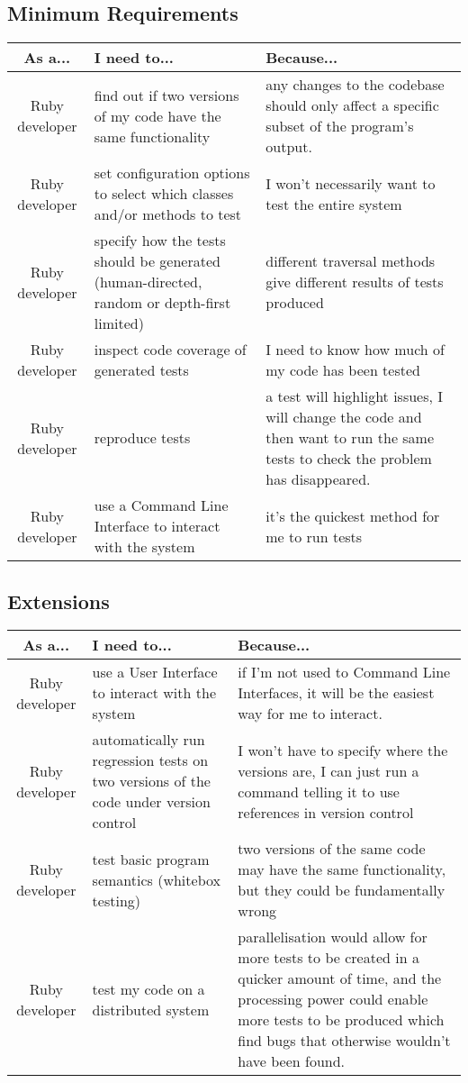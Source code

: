   \subsection{Minimum Requirements}
    \begin{tabular}{| c | p{5cm} | p{5cm} |}
    \hline
    \textbf{As a...} & \textbf{I need to...} & \textbf{Because...} \\
    \hline
    Ruby developer & find out if two versions of my code have the same functionality & any changes to the codebase should only affect a specific subset of the program’s output. \\
    \hline
    Ruby developer & set configuration options to select which classes and/or methods to test & I won't necessarily want to test the entire system \\
    \hline
    Ruby developer & specify how the tests should be generated (human-directed, random or depth-first limited) & different traversal methods give different results of tests produced \\
    Ruby developer & inspect code coverage of generated tests & I need to know how much of my code has been tested \\
    \hline
    Ruby developer & reproduce tests & a test will highlight issues, I will change the code and then want to run the same tests to check the problem has disappeared. \\
    \hline
    Ruby developer & use a Command Line Interface to interact with the system & it's the quickest method for me to run tests \\
    \hline
    \end{tabular}
  \subsection{Extensions}
    \begin{tabular}{| c | p{5cm} | p{5cm} |}
    \hline
    \textbf{As a...} & \textbf{I need to...} & \textbf{Because...} \\
    \hline
    Ruby developer & use a User Interface to interact with the system & if I'm not used to Command Line Interfaces, it will be the easiest way for me to interact. \\
    \hline
    Ruby developer & automatically run regression tests on two versions of the code under version control & I won't have to specify where the versions are, I can just run a command telling it to use references in version control \\
    \hline
    Ruby developer & test basic program semantics (whitebox testing) & two versions of the same code may have the same functionality, but they could be fundamentally wrong \\
    \hline
    Ruby developer & test my code on a distributed system & parallelisation would allow for more tests to be created in a quicker amount of time, and the processing power could enable more tests to be produced which find bugs that otherwise wouldn't have been found. \\
    \hline
    \end{tabular}
